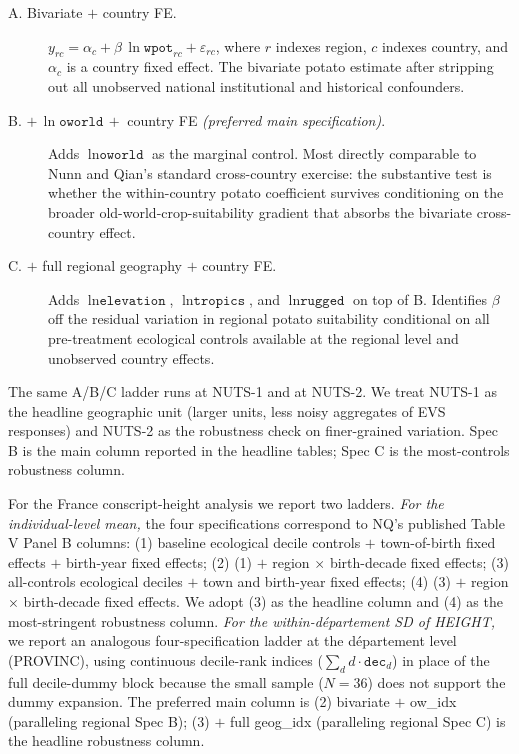 \begin{description}
\item[A. Bivariate $+$ country FE.] $y_{rc} = \alpha_c + \beta\,\ln\texttt{wpot}_{rc} + \varepsilon_{rc}$, where $r$ indexes region, $c$ indexes country, and $\alpha_c$ is a country fixed effect. The bivariate potato estimate after stripping out all unobserved national institutional and historical confounders.
\item[B. $+\,\ln \texttt{oworld}\,+$ country FE \emph{(preferred main specification)}.] Adds $\ln \texttt{oworld}$ as the marginal control. Most directly comparable to Nunn and Qian's standard cross-country exercise: the substantive test is whether the within-country potato coefficient survives conditioning on the broader old-world-crop-suitability gradient that absorbs the bivariate cross-country effect.
\item[C. $+$ full regional geography $+$ country FE.] Adds $\ln \texttt{elevation}$, $\ln \texttt{tropics}$, and $\ln \texttt{rugged}$ on top of B. Identifies $\beta$ off the residual variation in regional potato suitability conditional on all pre-treatment ecological controls available at the regional level and unobserved country effects.
\end{description}

The same A/B/C ladder runs at NUTS-1 and at NUTS-2. We treat NUTS-1 as the headline geographic unit (larger units, less noisy aggregates of EVS responses) and NUTS-2 as the robustness check on finer-grained variation. Spec B is the main column reported in the headline tables; Spec C is the most-controls robustness column.

For the France conscript-height analysis we report two ladders. \emph{For the individual-level mean,} the four specifications correspond to NQ's published Table V Panel B columns: (1) baseline ecological decile controls $+$ town-of-birth fixed effects $+$ birth-year fixed effects; (2) (1) $+$ region $\times$ birth-decade fixed effects; (3) all-controls ecological deciles $+$ town and birth-year fixed effects; (4) (3) $+$ region $\times$ birth-decade fixed effects. We adopt (3) as the headline column and (4) as the most-stringent robustness column. \emph{For the within-département SD of HEIGHT,} we report an analogous four-specification ladder at the département level (PROVINC), using continuous decile-rank indices ($\sum_{d} d\cdot \texttt{dec}_d$) in place of the full decile-dummy block because the small sample ($N=36$) does not support the dummy expansion. The preferred main column is (2) bivariate $+$ ow\_idx (paralleling regional Spec B); (3) $+$ full geog\_idx (paralleling regional Spec C) is the headline robustness column.

